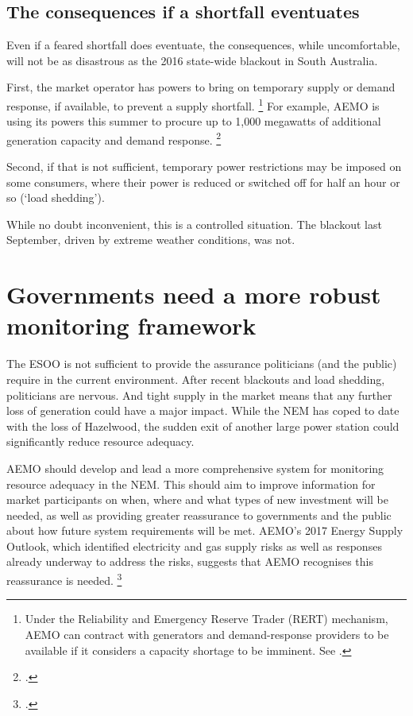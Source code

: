 \documentclass[FrontPage]{grattan}
\begin{document}
\subsection{The consequences if a shortfall eventuates}\label{subsec:consequences-if-a-shortfall-eventuates}
Even if a feared shortfall does eventuate, the consequences, while uncomfortable, will not be as disastrous as the 2016 state-wide blackout in South Australia.

First, the market operator has powers to bring on temporary supply or demand response, if available, to prevent a supply shortfall.%
\footnote{Under the Reliability and Emergency Reserve Trader (RERT) mechanism, AEMO can contract with generators and demand-response providers to be available if it considers a capacity shortage to be imminent. See \textcite{WoodBlowers-2017-Powering-Through}.}
For example, AEMO is using its powers this summer to procure up to 1,000 megawatts of additional generation capacity and demand response.%
\footcite{AEMO2017AdviceDispatchableCapacity}

Second, if that is not sufficient, temporary power restrictions may be imposed on some consumers, where their power is reduced or switched off for half an hour or so (`load shedding').

While no doubt inconvenient, this is a controlled situation. The blackout last September, driven by extreme weather conditions, was not.

\section{Governments need a more robust monitoring framework}\label{sec:governments-need-a-more-robust-monitoring-framework}
The ESOO is not sufficient to provide the assurance politicians (and the public) require in the current environment. After recent blackouts and load shedding, politicians are nervous. And tight supply in the market means that any further loss of generation could have a major impact. While the NEM has coped to date with the loss of Hazelwood, the sudden exit of another large power station could significantly reduce resource adequacy.

AEMO should develop and lead a more comprehensive system for monitoring resource adequacy in the NEM\@. This should aim to improve information for market participants on when, where and what types of new investment will be needed, as well as providing greater reassurance to governments and the public about how future system requirements will be met. AEMO's 2017 Energy Supply Outlook, which identified electricity and gas supply risks as well as responses already underway to address the risks, suggests that AEMO recognises this reassurance is needed.%
\footcite{AEMO2017ESO}
\end{document}
